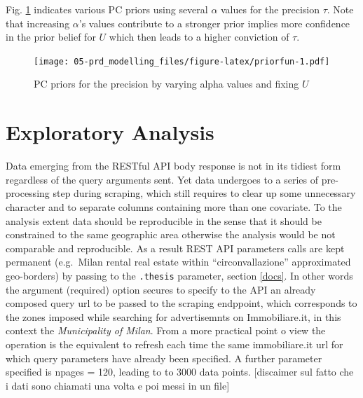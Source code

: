 \documentclass[
  12pt,
  a4paper,
  oneside]{book}
\newcommand{\passthrough}[1]{#1}
\theoremstyle{definition}
\theoremstyle{definition}
\theoremstyle{definition}
\theoremstyle{remark}
\begin{document}
Fig. \ref{fig:priorfun} indicates various PC priors using several \(\alpha\) values for the precision \(\tau\). Note that increasing \(\alpha\)'s values contribute to a stronger prior implies more confidence in the prior belief for \(U\) which then leads to a higher conviction of \(\tau\).

\begin{figure}
\centering
\texttt{[image: 05-prd\_modelling\_files/figure-latex/priorfun-1.pdf]}
\caption{\label{fig:priorfun}PC priors for the precision by varying alpha values and fixing \(U\)}
\end{figure}

\hypertarget{exploratory}{%
\chapter{Exploratory Analysis}\label{exploratory}}

Data emerging from the RESTful API body response is not in its tidiest form regardless of the query arguments sent. Yet data undergoes to a series of pre-processing step during scraping, which still requires to clear up some unnecessary character and to separate columns containing more than one covariate. To the analysis extent data should be reproducible in the sense that it should be constrained to the same geographic area otherwise the analysis would be not comparable and reproducible. As a result REST API parameters calls are kept permanent (e.g.~Milan rental real estate within ``circonvallazione'' approximated geo-borders) by passing to the \passthrough{\lstinline!.thesis!} parameter, section \ref{docs}. In other words the argument (required) option secures to specify to the API an already composed query url to be passed to the scraping endppoint, which corresponds to the zones imposed while searching for advertisemnts on Immobiliare.it, in this context the \emph{Municipality of Milan}. From a more practical point o view the operation is the equivalent to refresh each time the same immobiliare.it url for which query parameters have already been specified. A further parameter specified is npages = 120, leading to to 3000 data points. {[}discaimer sul fatto che i dati sono chiamati una volta e poi messi in un file{]}
\end{document}
